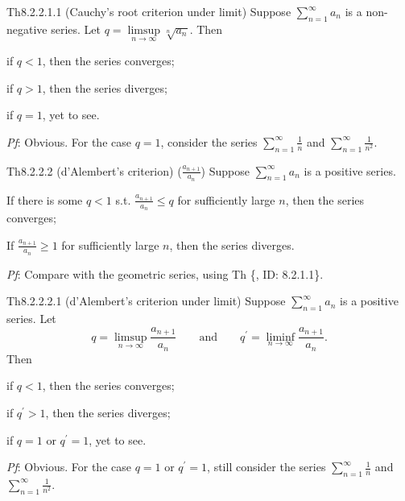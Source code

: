\documentclass{article}
\begin{document}
\begin{Th}{Th8.2.2.1.1 (Cauchy's root criterion under limit)}
    Suppose $\sum_{n=1}^{\infty} a_n$ is a non-negative series. Let $q = \limsup\limits_{n\to\infty} \sqrt[n]{a_n}$. Then
    \begin{compactenum}
        \item if $q<1$, then the series converges;
        \item if $q>1$, then the series diverges;
        \item if $q = 1$, yet to see.
    \end{compactenum}
    \tcblower
    \textit{Pf}: Obvious. For the case $q = 1$, consider the series $\sum_{n=1}^{\infty} \frac{1}{n}$ and $\sum_{n=1}^{\infty} \frac{1}{n^2}$.
\end{Th}

\begin{Th}{Th8.2.2.2 (d'Alembert's criterion) ($\frac{a_{n+1}}{a_n}$)}
    Suppose $\sum_{n=1}^{\infty} a_n$ is a positive series.
    \begin{compactenum}
        \item If there is some $q<1$ s.t. $\frac{a_{n+1}}{a_n} \leq q$ for sufficiently large $n$, then the series converges;
        \item If $\frac{a_{n+1}}{a_n} \geq 1$ for sufficiently large $n$, then the series diverges.
    \end{compactenum}
    \tcblower
    \textit{Pf}: Compare with the geometric series, using Th \{, ID: 8.2.1.1\}.
\end{Th}

\begin{Th}{Th8.2.2.2.1 (d'Alembert's criterion under limit)}
    Suppose $\sum_{n=1}^{\infty} a_n$ is a positive series. Let
    $$ q = \limsup_{n\to\infty} \frac{a_{n+1}}{a_n} \qquad \text{and} \qquad q^\prime = \liminf_{n\to\infty} \frac{a_{n+1}}{a_n}. $$
    Then
    \begin{compactenum}
        \item if $q < 1$, then the series converges;
        \item if $q^\prime > 1$, then the series diverges;
        \item if $q = 1$ or $q^\prime = 1$, yet to see.
    \end{compactenum}
    \tcblower
    \textit{Pf}: Obvious. For the case $q = 1$ or $q^\prime = 1$, still consider the series $\sum_{n=1}^{\infty} \frac{1}{n}$ and $\sum_{n=1}^{\infty} \frac{1}{n^2}$.
\end{Th}
\end{document}
